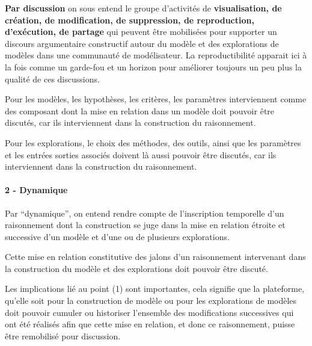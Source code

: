 \textbf{Par discussion} on sous entend le groupe d'activités de \textbf{visualisation, de création, de modification, de suppression, de reproduction, d'exécution, de partage} qui peuvent être mobilisées pour supporter un discours argumentaire constructif autour du modèle et des explorations de modèles dans une communauté de modélisateur. La reproductibilité apparait ici à la fois comme un garde-fou et un horizon pour améliorer toujours un peu plus la qualité de ces discussions. 

Pour les modèles, les hypothèses, les critères, les paramètres interviennent comme des composant dont la mise en relation dans un modèle doit pouvoir être discutés, car ils interviennent dans la construction du raisonnement.

Pour les explorations, le choix des méthodes, des outils, ainsi que les paramètres et les entrées sorties associés doivent là aussi pouvoir être discutés, car ils interviennent dans la construction du raisonnement.



\paragraph{2 - Dynamique}

Par \enquote{dynamique}, on entend rendre compte de l'inscription temporelle d'un raisonnement dont la construction se juge dans la mise en relation étroite et successive d'un modèle et d'une ou de plusieurs explorations. 

Cette mise en relation constitutive des jalons d'un raisonnement intervenant dans la construction du modèle et des explorations doit pouvoir être discuté.

Les implications lié au point (1) sont importantes, cela signifie que la plateforme, qu'elle soit pour la construction de modèle ou pour les explorations de modèles doit pouvoir cumuler ou historiser l'ensemble des modifications successives qui ont été réalisés afin que cette mise en relation, et donc ce raisonnement, puisse être remobilisé pour discussion.

